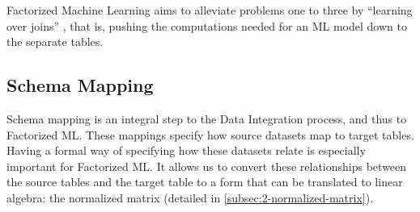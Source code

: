 Factorized Machine Learning aims to alleviate problems one to three by “learning over joins” \cite{orion_learning_gen_lin_models}, that is, pushing the computations needed for an ML model down to the separate tables.

\subsection{Schema Mapping}
Schema mapping is an integral step to the Data Integration process, and thus to Factorized ML. These mappings specify how source datasets map to target tables. Having a formal way of specifying how these datasets relate is especially important for Factorized ML. It allows us to convert these relationships between the source tables and the target table to a form that can be translated to linear algebra: the normalized matrix (detailed in \autoref{subsec:2-normalized-matrix}).


